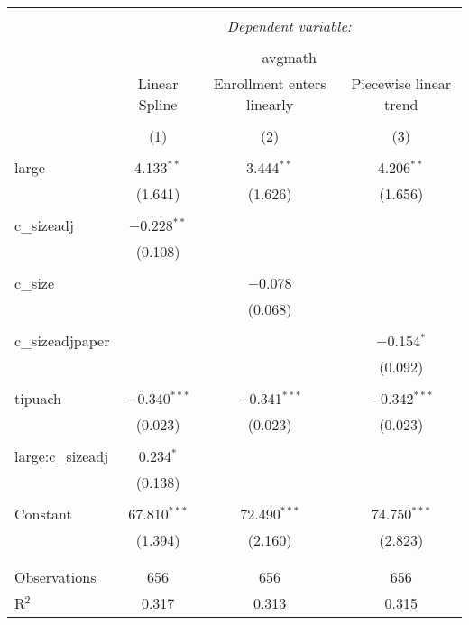 
\begin{table}[!htbp] \centering 
  \caption{} 
  \label{} 
\begin{tabular}{@{\extracolsep{5pt}}lccc} 
\\[-1.8ex]\hline 
\hline \\[-1.8ex] 
 & \multicolumn{3}{c}{\textit{Dependent variable:}} \\ 
\cline{2-4} 
\\[-1.8ex] & \multicolumn{3}{c}{avgmath} \\ 
 & Linear Spline & Enrollment enters linearly & Piecewise linear trend \\ 
\\[-1.8ex] & (1) & (2) & (3)\\ 
\hline \\[-1.8ex] 
 large & 4.133$^{**}$ & 3.444$^{**}$ & 4.206$^{**}$ \\ 
  & (1.641) & (1.626) & (1.656) \\ 
  & & & \\ 
 c\_sizeadj & $-$0.228$^{**}$ &  &  \\ 
  & (0.108) &  &  \\ 
  & & & \\ 
 c\_size &  & $-$0.078 &  \\ 
  &  & (0.068) &  \\ 
  & & & \\ 
 c\_sizeadjpaper &  &  & $-$0.154$^{*}$ \\ 
  &  &  & (0.092) \\ 
  & & & \\ 
 tipuach & $-$0.340$^{***}$ & $-$0.341$^{***}$ & $-$0.342$^{***}$ \\ 
  & (0.023) & (0.023) & (0.023) \\ 
  & & & \\ 
 large:c\_sizeadj & 0.234$^{*}$ &  &  \\ 
  & (0.138) &  &  \\ 
  & & & \\ 
 Constant & 67.810$^{***}$ & 72.490$^{***}$ & 74.750$^{***}$ \\ 
  & (1.394) & (2.160) & (2.823) \\ 
  & & & \\ 
\hline \\[-1.8ex] 
Observations & 656 & 656 & 656 \\ 
R$^{2}$ & 0.317 & 0.313 & 0.315 \\ 

\end{tabular}
\end{table}
